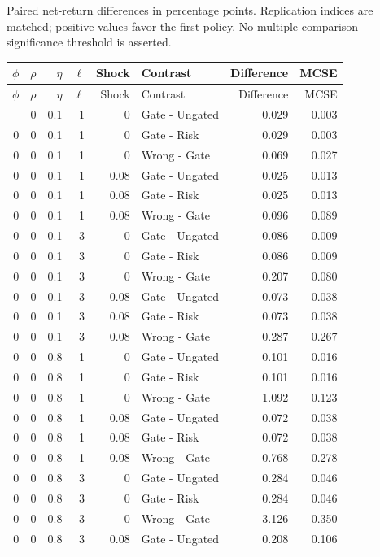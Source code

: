 Paired net-return differences in percentage points. Replication indices are matched; positive values favor the first policy. No multiple-comparison significance threshold is asserted.
\begingroup\footnotesize\setlength{\tabcolsep}{4pt}
\begin{longtable}{rrrrrlrr}\toprule
$\phi$ & $\rho$ & $\eta$ & $\ell$ & Shock & Contrast & Difference & MCSE\\\midrule\endfirsthead
\toprule $\phi$ & $\rho$ & $\eta$ & $\ell$ & Shock & Contrast & Difference & MCSE\\\midrule\endhead
\bottomrule\endfoot
0 & 0 & 0.1 & 1 & 0 & Gate - Ungated & 0.029 & 0.003\\
0 & 0 & 0.1 & 1 & 0 & Gate - Risk & 0.029 & 0.003\\
0 & 0 & 0.1 & 1 & 0 & Wrong - Gate & 0.069 & 0.027\\
0 & 0 & 0.1 & 1 & 0.08 & Gate - Ungated & 0.025 & 0.013\\
0 & 0 & 0.1 & 1 & 0.08 & Gate - Risk & 0.025 & 0.013\\
0 & 0 & 0.1 & 1 & 0.08 & Wrong - Gate & 0.096 & 0.089\\
0 & 0 & 0.1 & 3 & 0 & Gate - Ungated & 0.086 & 0.009\\
0 & 0 & 0.1 & 3 & 0 & Gate - Risk & 0.086 & 0.009\\
0 & 0 & 0.1 & 3 & 0 & Wrong - Gate & 0.207 & 0.080\\
0 & 0 & 0.1 & 3 & 0.08 & Gate - Ungated & 0.073 & 0.038\\
0 & 0 & 0.1 & 3 & 0.08 & Gate - Risk & 0.073 & 0.038\\
0 & 0 & 0.1 & 3 & 0.08 & Wrong - Gate & 0.287 & 0.267\\
0 & 0 & 0.8 & 1 & 0 & Gate - Ungated & 0.101 & 0.016\\
0 & 0 & 0.8 & 1 & 0 & Gate - Risk & 0.101 & 0.016\\
0 & 0 & 0.8 & 1 & 0 & Wrong - Gate & 1.092 & 0.123\\
0 & 0 & 0.8 & 1 & 0.08 & Gate - Ungated & 0.072 & 0.038\\
0 & 0 & 0.8 & 1 & 0.08 & Gate - Risk & 0.072 & 0.038\\
0 & 0 & 0.8 & 1 & 0.08 & Wrong - Gate & 0.768 & 0.278\\
0 & 0 & 0.8 & 3 & 0 & Gate - Ungated & 0.284 & 0.046\\
0 & 0 & 0.8 & 3 & 0 & Gate - Risk & 0.284 & 0.046\\
0 & 0 & 0.8 & 3 & 0 & Wrong - Gate & 3.126 & 0.350\\
0 & 0 & 0.8 & 3 & 0.08 & Gate - Ungated & 0.208 & 0.106\\

\end{longtable}
